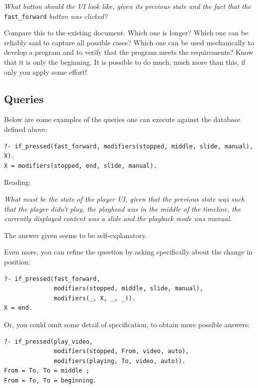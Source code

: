 \documentclass[11pt]{article}
\begin{document}
\emph{What button should the UI look like, given its previous state and the fact}
\emph{that the} \texttt{fast\_forward} \emph{button was clicked?}

Compare this to the existing document.  Which one is longer? Which one can be
reliably said to capture all possible cases?  Which one can be used mechanically
to develop a program and to verify that the program meets the requirements?
Know that it is only the beginning.  It is possible to do much, much more than
this, if only you apply some effort!
\subsection{Queries}
\label{sec-2-4}

Below are some examples of the queries one can execute against the database
defined above:

\begin{verbatim}
?- if_pressed(fast_forward, modifiers(stopped, middle, slide, manual), X).
X = modifiers(stopped, end, slide, manual).
\end{verbatim}

Reading:

\emph{What must be the state of the player UI, given that the previous state was}
\emph{such that the player didn't play, the playhead was in the middle of the}
\emph{timeline, the currently displayed content was a slide and the playback mode}
\emph{was manual}.

The answer given seems to be self-explanatory.

Even more, you can refine the question by asking specifically about the
change in position:

\begin{verbatim}
?- if_pressed(fast_forward,
              modifiers(stopped, middle, slide, manual),
              modifiers(_, X, _, _)).
X = end.
\end{verbatim}

Or, you could omit some detail of specification, to obtain more possible
answers:

\begin{verbatim}
?- if_pressed(play_video,
              modifiers(stopped, From, video, auto),
              modifiers(playing, To, video, auto)).
From = To, To = middle ;
From = To, To = beginning.
\end{verbatim}
\end{document}
